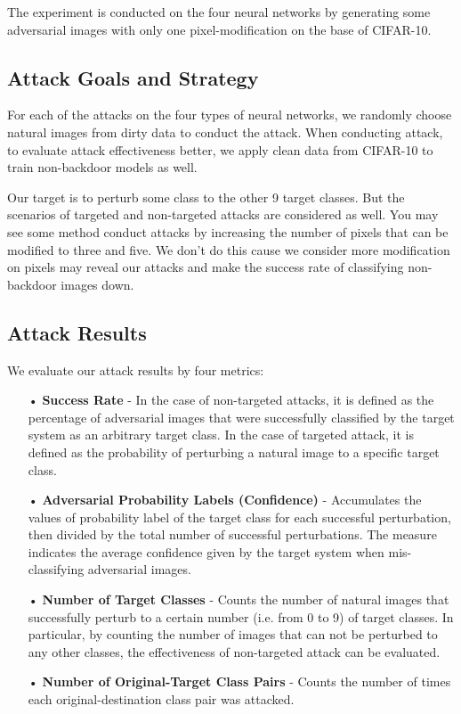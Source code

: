 \documentclass[runningheads]{llncs}
\begin{document}
The experiment is conducted on the four neural networks by generating some adversarial images with only one pixel-modification on the base of CIFAR-10. 

\subsection{Attack Goals and Strategy}
For each of the attacks on the four types of neural networks, we randomly choose natural images from dirty data to conduct the attack. When conducting attack, to evaluate attack effectiveness better, we apply clean data from CIFAR-10 to train non-backdoor models as well.

Our target is to perturb some class to the other 9 target classes. But the scenarios of targeted and non-targeted attacks are considered as well. You may see some method conduct attacks by increasing the number of pixels that can be modified to three and five\cite{su2019one}. We don't do this cause we consider more modification on pixels may reveal our attacks and make the success rate of classifying non-backdoor images down. 

\subsection{Attack Results}
We evaluate our attack results by four metrics\cite{su2019one}:
\begin{itemize}
\item[•] \textbf{Success Rate} - In the case of non-targeted attacks, it is defined as the percentage of adversarial images that were successfully classified by the target system as an arbitrary target class. In the case of targeted attack, it is defined as the probability of perturbing a natural image to a specific target class.
\item[•] \textbf{Adversarial Probability Labels (Confidence)} - Accumulates the values of probability label of the target class for each successful perturbation, then divided by the total number of successful perturbations. The measure indicates the average confidence given by the target system when mis-classifying adversarial images.
\item[•] \textbf{Number of Target Classes} - Counts the number of natural images that successfully perturb to a certain number (i.e. from 0 to 9) of target classes. In particular, by counting the number of images that can not be perturbed to any other classes, the effectiveness of non-targeted attack can be evaluated.
\item[•] \textbf{Number of Original-Target Class Pairs} - Counts the number of times each original-destination class pair was attacked.
\end{itemize}
\end{document}
